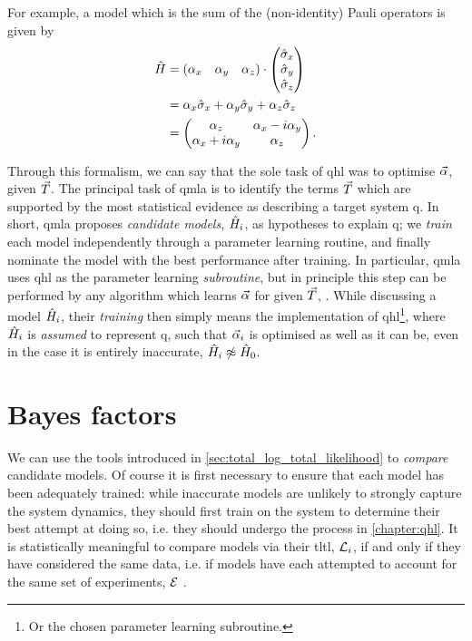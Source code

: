 For example, a model which is the sum of the (non-identity) Pauli operators is given by
\begin{align}
    \label{eqn:pauli_sum_model}
    \begin{split}
        \hat{H} &= \begin{matrix}(\alpha_x & \alpha_y & \alpha_z)\end{matrix} \cdot \left(\begin{matrix}\hat{\sigma}_{x} \\ \hat{\sigma}_{y} \\ \hat{\sigma}_{z}\end{matrix}\right) \\
        &= \alpha_x \hat{\sigma}_{x} + \alpha_y \hat{\sigma}_{y} + \alpha_z \hat{\sigma}_{z} \\
        &= \begin{pmatrix}
            \alpha_z & \alpha_x - i \alpha_y \\
            \alpha_x + i\alpha_y & \alpha_z
        \end{pmatrix}.
    \end{split}
\end{align}
\par 

Through this formalism, we can say that the sole task of \gls{qhl} was to optimise $\vec{\alpha}$, given ${ \vec{T} }$. 
The principal task of \gls{qmla} is to identify the terms ${ \vec{T} }$ 
    which are supported by the most statistical evidence as describing a target system \gls{q}. 
In short, \gls{qmla} proposes \emph{candidate models}, $\hat{H}_i$, as hypotheses to explain \gls{q}; 
    we \emph{train} each model independently through a parameter learning routine, 
    and finally nominate the model with the best performance after training. 
In particular, \gls{qmla} uses \gls{qhl} as the parameter learning \emph{subroutine}, 
    but in principle this step can be performed by any algorithm which learns $\vec{\alpha}$ for given ${ \vec{T} }$, 
    \cite{wang2015hamiltonian, krastanov2019stochastic, flurin2020using, niu2019learning, 
    greplova2017quantum, lokhov2018optimal, acampora2019evolutionary, burgarth2017evolution, valenti2021scalable}. 
While discussing a model $\hat{H}_i$, their \emph{training} then simply means the implementation 
    of \gls{qhl}\footnote{Or the chosen parameter learning subroutine.}, 
    where $\hat{H}_i$ is \emph{assumed} to represent \gls{q}, 
    such that $\vec{\alpha}_i$ is optimised as well as it can be, 
    even in the case it is entirely inaccurate, $\hat{H}_i \not\approx \hat{H}_0$. 

\section{Bayes factors}\label{sec:bayes_factors}
We can use the tools introduced in \cref{sec:total_log_total_likelihood} to \emph{compare} candidate models. 
Of course it is first necessary to ensure that each model has  
    been adequately trained: while inaccurate models are unlikely to strongly 
    capture the system dynamics, they should first train on the system 
    to determine their best attempt at doing so, 
    i.e. they should undergo the process in \cref{chapter:qhl}.
It is statistically meaningful to compare models via their \gls{tltl}, ${\mathcal{L}}_i$, 
    if and only if they have considered the same data, 
    i.e. if models have each attempted to account for the same set of \glspl{experiment}, ${ \mathcal{E} }$ \cite{kass1995bayes}.
\par 

